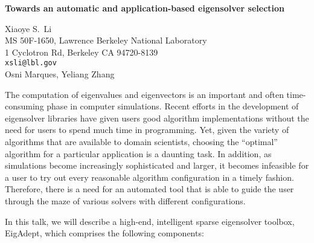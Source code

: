 \documentclass{report}
\begin{document}

\begin{center}
{\large
{\bf Towards an automatic and application-based eigensolver selection}}

	Xiaoye S.~Li \\
	MS 50F-1650, Lawrence Berkeley National Laboratory \\
	1 Cyclotron Rd, Berkeley CA 94720-8139 \\
	{\tt xsli@lbl.gov} \\
	Osni Marques, Yeliang Zhang
\end{center}
The computation of eigenvalues and eigenvectors is an
important and often time-consuming phase in computer
simulations. Recent efforts in the development of
eigensolver libraries have given users good algorithm
implementations without the need for users to spend much
time in programming. Yet, given the variety of algorithms
that are available to domain scientists, choosing the
``optimal'' algorithm for a particular application is a
daunting task. In addition, as simulations become
increasingly sophisticated and larger, it becomes infeasible
for a user to try out every reasonable algorithm
configuration in a timely fashion. Therefore, there is a
need for an automated tool that is able to guide the user
through the maze of various solvers with different
configurations.

In this talk, we will describe a
high-end, intelligent sparse eigensolver toolbox, EigAdept,
which comprises the following components:
\end{document}
